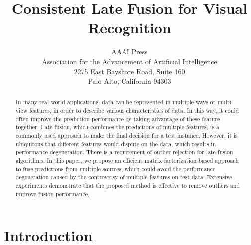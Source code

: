 \documentclass[letterpaper]{article}
\begin{document}
%



\title{Consistent Late Fusion for Visual Recognition}
\author{AAAI Press\\
Association for the Advancement of Artificial Intelligence\\
2275 East Bayshore Road, Suite 160\\
Palo Alto, California 94303\\
}

\maketitle



\begin{abstract}
In many real world applications, data can be represented in multiple ways or multi-view features,
in order to describe various characteristics of data.
In this way, it could often improve the prediction performance by taking advantage of these feature together.
Late fusion, which combines the predictions of multiple features, is a commonly used approach to make the final decision for a test instance.
However, it is ubiquitous that different features would dispute on the data, which results in performance degeneration.
There is a requirement of outlier rejection for late fusion algorithms.
In this paper, we propose an efficient matrix factorization based approach to fuse predictions from multiple sources, 
which could avoid the performance degeneration caused by the controversy of multiple features on test data.
Extensive experiments demonstrate that the proposed method is effective to remove outliers and improve fusion performance.

\end{abstract}




\section{Introduction}
\end{document}
